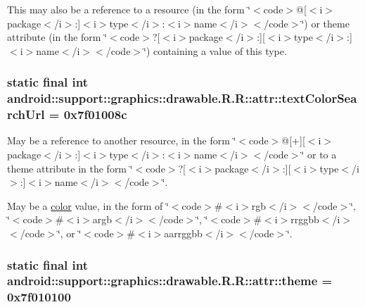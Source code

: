 This may also be a reference to a resource (in the form \char`\"{}$<$code$>$@\mbox{[}$<$i$>$package$<$/i$>$:\mbox{]}$<$i$>$type$<$/i$>$:$<$i$>$name$<$/i$>$$<$/code$>$\char`\"{}) or theme attribute (in the form \char`\"{}$<$code$>$?\mbox{[}$<$i$>$package$<$/i$>$:\mbox{]}\mbox{[}$<$i$>$type$<$/i$>$:\mbox{]}$<$i$>$name$<$/i$>$$<$/code$>$\char`\"{}) containing a value of this type. \hypertarget{classandroid_1_1support_1_1graphics_1_1drawable_1_1_r_1_1attr_e6187b10079c781a4f6e5cba76978277}{
\subsubsection[{textColorSearchUrl}]{\setlength{\rightskip}{0pt plus 5cm}static final int android::support::graphics::drawable.R.R::attr::textColorSearchUrl = 0x7f01008c}}
\label{classandroid_1_1support_1_1graphics_1_1drawable_1_1_r_1_1attr_e6187b10079c781a4f6e5cba76978277}


May be a reference to another resource, in the form \char`\"{}$<$code$>$@\mbox{[}+\mbox{]}\mbox{[}$<$i$>$package$<$/i$>$:\mbox{]}$<$i$>$type$<$/i$>$:$<$i$>$name$<$/i$>$$<$/code$>$\char`\"{} or to a theme attribute in the form \char`\"{}$<$code$>$?\mbox{[}$<$i$>$package$<$/i$>$:\mbox{]}\mbox{[}$<$i$>$type$<$/i$>$:\mbox{]}$<$i$>$name$<$/i$>$$<$/code$>$\char`\"{}. 

May be a \hyperlink{classandroid_1_1support_1_1graphics_1_1drawable_1_1_r_1_1color}{color} value, in the form of \char`\"{}$<$code$>$\#$<$i$>$rgb$<$/i$>$$<$/code$>$\char`\"{}, \char`\"{}$<$code$>$\#$<$i$>$argb$<$/i$>$$<$/code$>$\char`\"{}, \char`\"{}$<$code$>$\#$<$i$>$rrggbb$<$/i$>$$<$/code$>$\char`\"{}, or \char`\"{}$<$code$>$\#$<$i$>$aarrggbb$<$/i$>$$<$/code$>$\char`\"{}. \hypertarget{classandroid_1_1support_1_1graphics_1_1drawable_1_1_r_1_1attr_849442e2d553960c21fa9be130b26974}{
\subsubsection[{theme}]{\setlength{\rightskip}{0pt plus 5cm}static final int android::support::graphics::drawable.R.R::attr::theme = 0x7f010100}}
\label{classandroid_1_1support_1_1graphics_1_1drawable_1_1_r_1_1attr_849442e2d553960c21fa9be130b26974}


